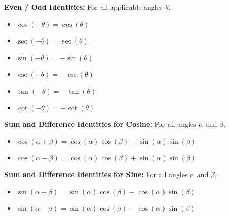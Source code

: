 \documentclass{ximera}
\begin{document}
\begin{callout}
 \textbf{Even / Odd Identities:}  For all applicable angles $\theta$, 
\begin{itemize}

\item  $\cos(-\theta) = \cos(\theta)$

\item  $\sec(-\theta) = \sec(\theta)$

\item  $\sin(-\theta) = -\sin(\theta)$

\item  $\csc(-\theta) = -\csc(\theta)$

\item  $\tan(-\theta) = -\tan(\theta)$

\item  $\cot(-\theta) = -\cot(\theta)$

\end{itemize}
\end{callout}


\begin{callout}
\textbf{Sum and Difference Identities for Cosine:} For all angles $\alpha$ and $\beta$, 
\begin{itemize}

\item  $\cos(\alpha + \beta) = \cos(\alpha) \cos(\beta) - \sin(\alpha) \sin(\beta)$

\item $\cos(\alpha - \beta) = \cos(\alpha) \cos(\beta) + \sin(\alpha) \sin(\beta)$

\end{itemize}
\end{callout}


\begin{callout}
 \textbf{Sum and Difference Identities for Sine:} For all angles $\alpha$ and $\beta$, 
\begin{itemize}

\item  $\sin(\alpha + \beta) = \sin(\alpha) \cos(\beta) + \cos(\alpha) \sin(\beta)$

\item $\sin(\alpha - \beta) = \sin(\alpha) \cos(\beta) - \cos(\alpha) \sin(\beta)$

\end{itemize}
\end{callout}


\end{document}
